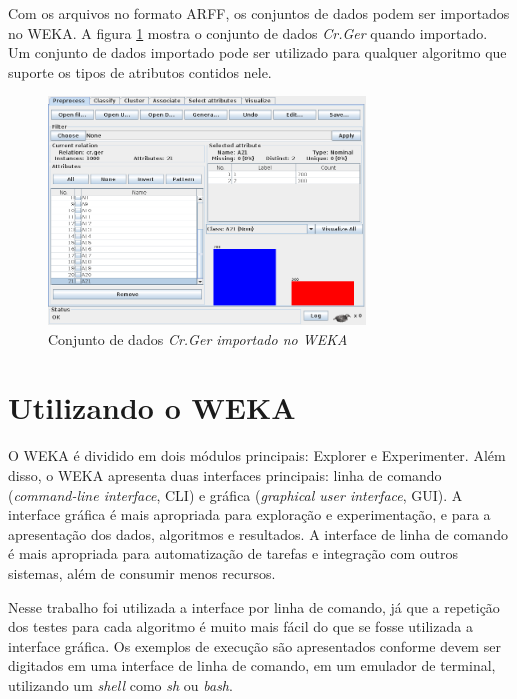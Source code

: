 Com os arquivos no formato ARFF, os conjuntos de dados podem ser importados no WEKA. A figura \ref{fig:dev_weka_arff} mostra o conjunto de dados \emph{Cr.Ger} quando importado. Um conjunto de dados importado pode ser utilizado para qualquer algoritmo que suporte os tipos de atributos contidos nele.

\vspace{0.5cm}
\begin{figure}[h!]
    \centering
    \caption{Conjunto de dados \emph{Cr.Ger importado no WEKA}}
    \label{fig:dev_weka_arff}
    \vspace{0.5cm}
    \includegraphics[width=0.75\textwidth]{img/cr_ger.png}
    \vspace{0.5cm}
\end{figure}
\vspace{0.5cm}

\section{Utilizando o WEKA}

O WEKA é dividido em dois módulos principais: Explorer e Experimenter. Além disso, o WEKA apresenta duas interfaces principais: linha de comando (\emph{command-line interface}, CLI) e gráfica (\emph{graphical user interface}, GUI). A interface gráfica é mais apropriada para exploração e experimentação, e para a apresentação dos dados, algoritmos e resultados. A interface de linha de comando é mais apropriada para automatização de tarefas e integração com outros sistemas, além de consumir menos recursos.

Nesse trabalho foi utilizada a interface por linha de comando, já que a repetição dos testes para cada algoritmo é muito mais fácil do que se fosse utilizada a interface gráfica. Os exemplos de execução são apresentados conforme devem ser digitados em uma interface de linha de comando, em um emulador de terminal, utilizando um \emph{shell} como \emph{sh} ou \emph{bash}.

